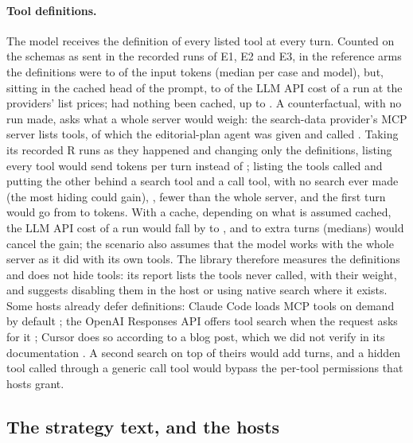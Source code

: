 \paragraph{Tool definitions.} The model receives the definition of every listed tool at every turn. Counted on the
schemas as sent in the \SthreeDefRuns{} recorded runs of E1, E2 and E3, in the reference arms the definitions were
\SthreeDefInputMin{} to \SthreeDefInputMax{} of the input tokens (median per case and model), but, sitting in the
cached head of the prompt, \SthreeDefCostMin{} to \SthreeDefCostMax{} of the LLM API cost of a run at the providers'
list prices; had nothing been cached, up to \SthreeDefUncachedMax. A counterfactual, with no run made, asks what a
whole server would weigh: the search-data provider's MCP server lists \SthreeDefServerTools{} tools, of which the
editorial-plan agent was given \SthreeDefCaseTools{} and called \SthreeDefUsedTools. Taking its
\SthreeDefScenarioRuns{} recorded R runs as they happened and changing only the definitions, listing every tool
would send \SthreeDefAllTokens{} tokens per turn instead of \SthreeDefCaseTokens; listing the tools called and
putting the other \SthreeDefHiddenTools{} behind a search tool and a call tool, with no search ever made (the most
hiding could gain), \SthreeDefDeferredTokens, \SthreeDefSavedShare{} fewer than the whole server, and the first turn
would go from \SthreeDefFirstTurnAll{} to \SthreeDefFirstTurnHidden{} tokens. With a cache, depending on what is
assumed cached, the LLM API cost of a run would fall by \SthreeDefHideGainMin{} to \SthreeDefHideGainMax, and
\SthreeDefExtraTurnsMin{} to \SthreeDefExtraTurnsMax{} extra turns (medians) would cancel the gain; the scenario
also assumes that the model works with the whole server as it did with its own tools. The library therefore
measures the definitions and does not hide tools: its report lists the tools never called, with their weight, and
suggests disabling them in the host or using native search where it exists. Some hosts already defer definitions:
Claude Code loads MCP tools on demand by default \citep{anthropic2026mcp}; the OpenAI Responses API offers tool
search when the request asks for it \citep{openai2026toolsearch}; Cursor does so according to a blog post, which we
did not verify in its documentation \citep{cursor2026dynamic}. A second search on top of theirs would add turns, and
a hidden tool called through a generic call tool would bypass the per-tool permissions that hosts grant.

\subsection{The strategy text, and the hosts}
\label{sec:s3pointer}

